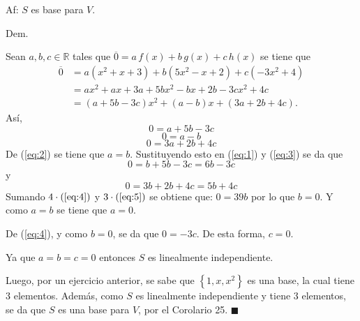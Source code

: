 \documentclass[fleqn]{article}
\begin{document}
\begin{enumerate}
        Af: $ S $ es base para $ V $.
        
        Dem.

        Sean $ a, b, c \in \mathbb{R} $ tales que $ \overline{0} = a \, f(x) + b \, g(x) + c \, h(x) $ se tiene que 
        \begin{equation*}
            \begin{split}
                \overline{0} &= a(x^2 + x + 3) + b(5x^2 - x + 2) + c(-3x^2 + 4) \\
                &= ax^2 + ax + 3a + 5bx^2 - bx + 2b - 3cx^2 + 4c \\
                &= (a + 5b - 3c)x^2 + (a - b)x + (3a + 2b + 4c).
            \end{split}
        \end{equation*}
        Así, 
        \begin{equation}
            0 = a + 5b - 3c
            \label{eq:1}
        \end{equation}
        \begin{equation}
            0 = a - b
            \label{eq:2}
        \end{equation}
        \begin{equation}
            0 = 3a + 2b + 4c
            \label{eq:3}
        \end{equation}
        De (\ref{eq:2}) se tiene que $ a = b $. Sustituyendo esto en (\ref{eq:1}) y (\ref{eq:3}) se da que
        \begin{equation}
            0 = b + 5b - 3c = 6b - 3c
            \label{eq:4}
        \end{equation}
        y
        \begin{equation}
            0 = 3b + 2b + 4c = 5b + 4c
            \label{eq:5}
        \end{equation}
        Sumando $ 4 \cdot (\ref{eq:4}) $ y $ 3 \cdot (\ref{eq:5}) $ se obtiene que: $ 0 = 39b $ por lo que $ b = 0 $. Y como $ a = b $ se tiene que $ a = 0 $.

        De (\ref{eq:4}), y como $ b = 0 $, se da que $ 0 = - 3c $. De esta forma, $ c = 0 $.

        Ya que $ a = b = c = 0 $ entonces $ S $ es linealmente independiente.

        Luego, por un ejercicio anterior, se sabe que $ \left\lbrace 1, x, x^2 \right\rbrace $ es una base, la cual tiene 3 elementos. Además, como $ S $ es linealmente independiente y tiene 3 elementos, se da que $ S $ es una base para $ V $, por el Corolario 25. $ \blacksquare $
    
    \end{enumerate}
\end{document}
